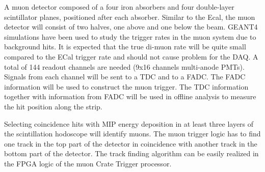 A muon detector composed of a four iron absorbers  and four double-layer scintillator planes, positioned after each absorber. Similar to the Ecal, the muon detector will consist of two halves, one above and one below the beam.
GEANT4 simulations have been used to study the trigger rates in the muon system due to background hits. It is expected that the true di-muon rate will be quite small compared to the ECal trigger rate and should not cause problem for the DAQ. 
A total of 144 readout channels are needed (9x16 channels multi-anode PMTs). Signals from each channel will be sent to a TDC and to a FADC. The FADC information will be used to construct the muon trigger. The TDC information together with information from FADC will be used in offline analysis to measure the hit position along the strip.

Selecting coincidence hits with MIP energy deposition in at least three layers of the scintillation hodoscope will identify muons. 
The muon trigger logic has to find one track in the top part of the detector in coincidence with another track in the bottom part of the detector. The track finding algorithm can be easily realized in the FPGA logic of the muon Crate Trigger processor.

